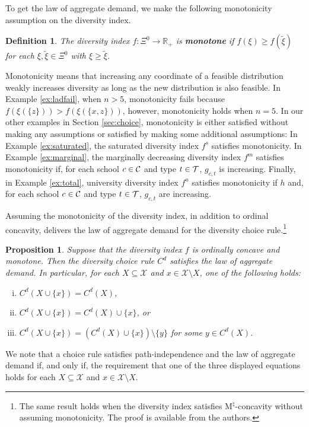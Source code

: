 \documentclass[12pt]{amsart}
\newtheorem{definition}{Definition}
\newtheorem{proposition}{Proposition}
\theoremstyle{remark}
\def\oconcave{ordinally concave} %
\begin{document}
To get the law of aggregate demand, we make the following monotonicity assumption
on the diversity index.

\begin{comment}
\begin{definition}
The diversity index $f: \Xi^0 \rightarrow \mathbb{R}_+$ is \textbf{monotone} if, for every $\xi,\tilde{\xi} \in \Xi^0$,
\[\xi\geq \tilde{\xi} \; \implies \; f(\xi) \geq f(\tilde{\xi}). \]
\end{definition}
\end{comment}

\begin{definition}
The diversity index $f: \Xi^0 \rightarrow \mathbb{R}_+$ is \textbf{monotone} if $f(\xi) \geq f(\tilde{\xi})$ for each $\xi,\tilde{\xi} \in \Xi^0$ with $\xi\geq \tilde{\xi}$.
\end{definition}

Monotonicity means that increasing any coordinate of a feasible distribution
weakly increases diversity as long as the new distribution is also feasible. In Example \ref{ex:ladfail},
when $n>5$, monotonicity fails because $f(\xi(\{z\}))>f(\xi(\{x,z\}))$, however,
monotonicity holds when $n=5$. In our other examples in Section \ref{sec:choice},
monotonicity is either satisfied without making any assumptions or satisfied
by making some additional assumptions: In Example \ref{ex:saturated}, the
saturated diversity index $f^s$ satisfies monotonicity. In Example \ref{ex:marginal}, the
marginally decreasing diversity index $f^m$
satisfies monotonicity if, for each school $c\in \mathcal{C}$ and
type $t\in \mathcal{T}$, $g_{c,t}$ is increasing. Finally, in Example \ref{ex:total}, university
diversity index $f^u$ satisfies monotonicity if $h$ and, for
each school $c\in \mathcal{C}$ and type $t\in \mathcal{T}$, $g_{c,t}$ are increasing.

Assuming the monotonicity of the diversity index, in addition to ordinal concavity,
delivers the law of aggregate demand for the diversity choice rule.\footnote{The same
result holds when the diversity index satisfies M$^{\natural}$-concavity without assuming
monotonicity. The proof is available from the authors.}

\begin{proposition}\label{prop:structure}
Suppose that the diversity index $f$ is \oconcave{} and monotone. Then
the diversity choice rule $C^d$ satisfies the law of aggregate demand.
In particular, for each $X\subseteq \mathcal{X}$ and
$x\in \mathcal{X}\setminus X$, one of the following holds:
\begin{enumerate}[(i)]
  \item $C^d(X\cup\{x\})=C^d(X)$,
  \item $C^d(X\cup\{x\})=C^d(X) \cup \{x\}$, or
  \item $C^d(X \cup\{x\})= (C^d(X) \cup \{x\})\setminus \{y\}$ for some $y\in C^d(X)$.
\end{enumerate}
\end{proposition}
We note that a choice rule satisfies path-independence and the law of aggregate demand if, and only if,
the requirement that one of the three displayed equations holds for
each $X\subseteq \mathcal{X}$ and $x\in \mathcal{X}\setminus X$.
\end{document}
